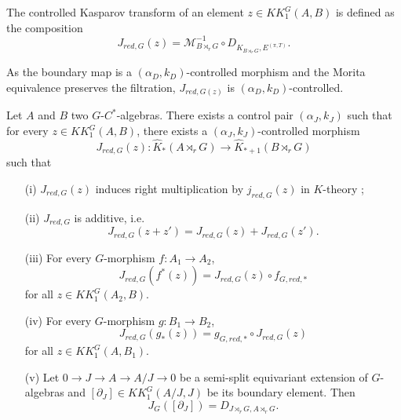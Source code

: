 \begin{definition}
The controlled Kasparov transform of an element $z\in KK_1^G(A,B)$ is defined as the composition
\[J_{red,G}(z)=\mathcal M_{B\rtimes_r G}^{-1}\circ D_{K_{B\rtimes_r G}, E^{(\pi,T)}}.\]
\end{definition}

As the boundary map is a $(\alpha_D,k_D)$-controlled morphism and the Morita equivalence preserves the filtration, $J_{red,G(z)}$ is  $(\alpha_D,k_D)$-controlled. 

\begin{prop}\label{Kasparov1}
Let $A$ and $B$ two $G$-$C^*$-algebras. There exists a control pair $(\alpha_J,k_J)$ such that for every $z\in KK^G_1(A,B)$, there exists a $(\alpha_J,k_J)$-controlled morphism
\[J_{red,G}(z) : \hat K_*(A\rtimes_r G)\rightarrow \hat K_{*+1}(B\rtimes_r G)\]
such that
\begin{enumerate}
\item[(i)] $J_{red,G}(z)$ induces right multiplication by $j_{red,G}(z)$ in $K$-theory ;
\item[(ii)] $J_{red,G}$ is additive, i.e.
\[J_{red,G}(z+z')=J_{red,G}(z)+J_{red,G}(z').\]
\item[(iii)] For every $G$-morphism $f : A_1\rightarrow A_2$,
\[J_{red,G}(f^*(z))=J_{red,G}(z)\circ f_{G,red,*}\] for all $z\in KK_1^G(A_2,B)$.
\item[(iv)] For every $G$-morphism $g : B_1\rightarrow B_2$,
\[J_{red,G}(g_*(z))= g_{G,red,*}\circ J_{red,G}(z)\] for all $z\in KK_1^G(A,B_1)$.
\item[(v)] Let $0\rightarrow J\rightarrow A\rightarrow A/J\rightarrow 0$ be a semi-split equivariant extension of $G$-algebras and $[\partial_J]\in KK_1^G(A/J,J)$ be its boundary element. Then 
\[J_G([\partial_J])=D_{J\rtimes_r G,A\rtimes_rG}.\] 
\end{enumerate}
\end{prop}

